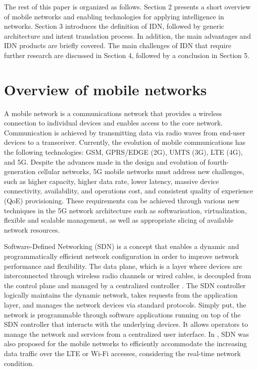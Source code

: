 The rest of this paper is organized as follows. Section 2 presents a short overview of mobile networks and enabling technologies for applying intelligence in networks. Section 3 introduces the definition of IDN, followed by generic architecture and intent translation process. In addition, the main advantages and IDN products are briefly covered. The main challenges of IDN that require further research are discussed in Section 4, followed by a conclusion in Section 5.

\section{Overview of mobile networks}
\label{sec:Overview_of_mobile_networks}

A mobile network is a communications network that provides a wireless connection to individual devices and enables access to the core network. Communication is achieved by transmitting data via radio waves from end-user devices to a transceiver. Currently, the evolution of mobile communications has the following technologies: GSM, GPRS/EDGE (2G), UMTS (3G), LTE (4G), and 5G. Despite the advances made in the design and evolution of fourth-generation cellular networks, 5G mobile networks must address new challenges, such as higher capacity, higher data rate, lower latency, massive device connectivity, availability, and operations cost, and consistent quality of experience (QoE) provisioning. These requirements can be achieved through various new techniques in the 5G network architecture such as softwarisation, virtualization, flexible and scalable management, as well as appropriate slicing of available network resources. \cite{Demestichas2013}

Software-Defined Networking (SDN) is a concept that enables a dynamic and programmatically efficient network configuration in order to improve network performance and flexibility. The data plane, which is a layer where devices are interconnected through wireless radio channels or wired cables, is decoupled from the control plane and managed by a centralized controller \cite{Li2015}. The SDN controller logically maintains the dynamic network, takes requests from the application layer, and manages the network devices via standard protocols. Simply put, the network is programmable through software applications running on top of the SDN controller that interacts with the underlying devices. It allows operators to manage the network and services from a centralized user interface. In \cite{Amani2014}, SDN was also proposed for the mobile networks to efficiently accommodate the increasing data traffic over the LTE or Wi-Fi accesses, considering the real-time network condition.

